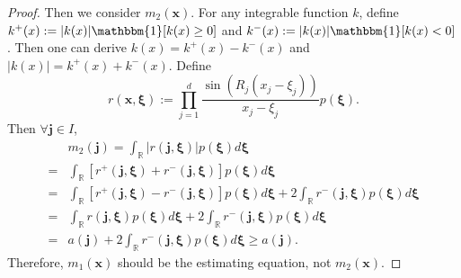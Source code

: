 \documentclass[%
 reprint,
 amsmath,amssymb,
 aps,
]{revtex4-2}
\def\R{\mathbb{R}}
\def\bxi{\boldsymbol{\xi}}
\def\bxi{\boldsymbol{\xi}}
\def\xbold{\mathbf{x}}
\begin{document}
\begin{proof}
    Then we consider $m_2(\xbold)$. For any integrable function $k$, define $k^+(x) := |k(x)|\mathbbm{1}[k(x) \ge 0]$ and $k^-(x) := |k(x)|\mathbbm{1}[k(x) < 0]$. Then one can derive $k(x) = k^+(x) - k^-(x)$ and $|k(x)| = k^+(x) + k^-(x)$. Define 
    \begin{equation*}
        r(\xbold, \bxi) := \prod_{j = 1}^d \frac{\sin(R_j(x_j - \xi_j))}{x_j - \xi_j} p(\bxi).
    \end{equation*}
    Then $\forall \mathbf{j} \in I$,
    \begin{align*}
        & m_2(\mathbf{j}) = \int_\R |r(\mathbf{j}, \bxi)|p(\bxi)d\bxi \\
        = & \int_\R [r^+(\mathbf{j}, \bxi) + r^-(\mathbf{j}, \bxi)]p(\bxi)d\bxi \\
        = & \int_\R [r^+(\mathbf{j}, \bxi) - r^-(\mathbf{j}, \bxi)]p(\bxi)d\bxi + 2\int_\R r^-(\mathbf{j}, \bxi)p(\bxi)d\bxi \\
        = & \int_\R r(\mathbf{j}, \bxi)p(\bxi)d\bxi + 2\int_\R r^-(\mathbf{j}, \bxi)p(\bxi)d\bxi \\
        = & a(\mathbf{j}) + 2\int_\R r^-(\mathbf{j}, \bxi)p(\bxi)d\bxi \ge a(\mathbf{j}).
    \end{align*}
Therefore, $m_1(\xbold)$ should be the estimating equation, not $m_2(\xbold)$.
\end{proof}


\end{document}
